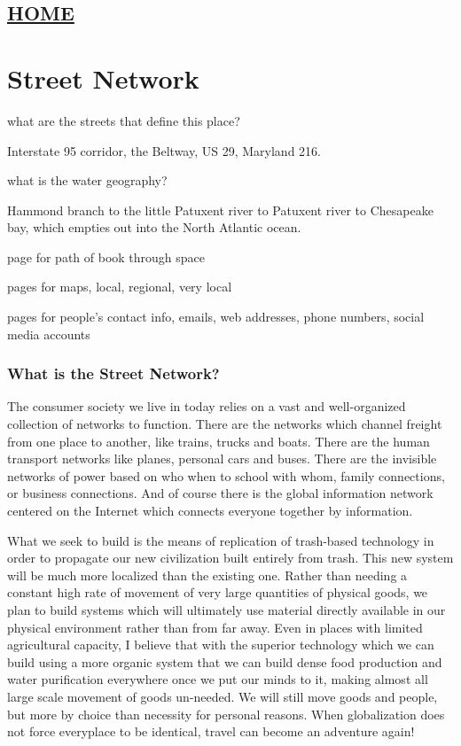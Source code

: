 \hypertarget{home}{%
\subsection{\texorpdfstring{\href{scrolls/home}{HOME}}{HOME}}\label{home}}

\hypertarget{street-network}{%
\section{Street Network}\label{street-network}}

what are the streets that define this place?

Interstate 95 corridor, the Beltway, US 29, Maryland 216.

what is the water geography?

Hammond branch to the little Patuxent river to Patuxent river to
Chesapeake bay, which empties out into the North Atlantic ocean.

page for path of book through space

pages for maps, local, regional, very local

pages for people's contact info, emails, web addresses, phone numbers,
social media accounts

\hypertarget{what-is-the-street-network}{%
\subsubsection{What is the Street
Network?}\label{what-is-the-street-network}}

The consumer society we live in today relies on a vast and
well-organized collection of networks to function. There are the
networks which channel freight from one place to another, like trains,
trucks and boats. There are the human transport networks like planes,
personal cars and buses. There are the invisible networks of power based
on who when to school with whom, family connections, or business
connections. And of course there is the global information network
centered on the Internet which connects everyone together by
information.

What we seek to build is the means of replication of trash-based
technology in order to propagate our new civilization built entirely
from trash. This new system will be much more localized than the
existing one. Rather than needing a constant high rate of movement of
very large quantities of physical goods, we plan to build systems which
will ultimately use material directly available in our physical
environment rather than from far away. Even in places with limited
agricultural capacity, I believe that with the superior technology which
we can build using a more organic system that we can build dense food
production and water purification everywhere once we put our minds to
it, making almost all large scale movement of goods un-needed. We will
still move goods and people, but more by choice than necessity for
personal reasons. When globalization does not force everyplace to be
identical, travel can become an adventure again!

